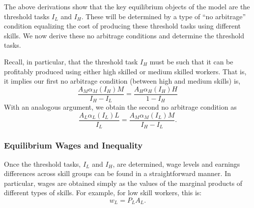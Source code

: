 \documentclass[12pt]{article}
\newcommand{\highlightP}[1]{{\emph{\color{MyPink}{#1}}}}
\theoremstyle{definition}
\begin{document}
The above derivations show that the key equilibrium objects of the model are the threshold tasks $I_L$ and $I_H$. These will be determined by a type of ``no arbitrage'' condition equalizing the cost of producing these threshold tasks using different skills. We now derive these no arbitrage conditions and determine the threshold tasks. 

Recall, in particular, that the threshold task $I_H$ must be such that it can be profitably produced using either high skilled or medium skilled workers. \highlightP{This is equivalent to task $I_H$ having the same equilibrium supply either when produced only with skilled or unskilled workers.} That is, it implies our first no arbitrage condition (between high and medium skills) is,
\begin{equation}
    \label{task_model_no_arbitrage_between_m_and_h}
	\frac{A_M \alpha_M\left(I_H\right) M}{I_H-I_L}=\frac{A_H \alpha_H\left(I_H\right) H}{1-I_H}
\end{equation}
With an analogous argument, we obtain the second no arbitrage condition as 
\begin{equation}
    \label{task_model_no_arbitrage_between_m_and_l}
	\frac{A_L \alpha_L\left(I_L\right) L}{I_L}=\frac{A_M \alpha_M\left(I_L\right) M}{I_H-I_L} .
\end{equation}

\subsubsection{Equilibrium Wages and Inequality}

Once the threshold tasks, $I_L$ and $I_H$, are determined, wage levels and earnings differences across skill groups can be found in a straightforward manner. In particular, wages are obtained simply as the values of the marginal products of different types of skills. For example, for low skill workers, this is:
\begin{equation}
    \label{task_model_wage_for_low_skill}
	w_L = P_L A_L .
\end{equation}
\end{document}
